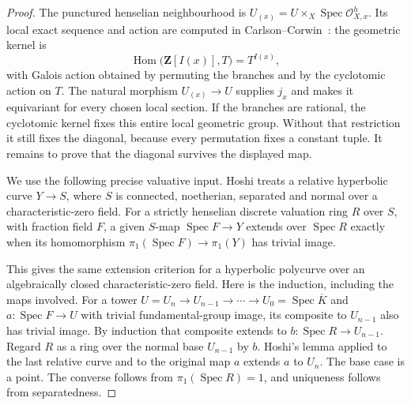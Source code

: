\documentclass[11pt,a4paper]{article}
\begin{document}
\begin{proof}
The punctured henselian neighbourhood is
$U_{(x)}=U\times_X\operatorname{Spec}\mathcal O^h_{X,x}$.
Its local exact sequence and action are computed in
Carlson--Corwin~\cite[Proposition 3.4]{B_CarlsonCorwin2026}:
the geometric kernel is
\[
 \operatorname{Hom}\bigl(\mathbf Z[I(x)],T\bigr)=T^{I(x)},
\]
with Galois action obtained by permuting the branches and by the
cyclotomic action on $T$. The natural morphism $U_{(x)}\to U$ supplies
$j_x$ and makes it equivariant for every chosen local section. If the
branches are rational, the cyclotomic kernel fixes this entire local
geometric group. Without that restriction it still fixes the diagonal,
because every permutation fixes a constant tuple. It remains to prove
that the diagonal survives the displayed map.

We use the following precise valuative input. Hoshi
\cite[Lemma 2.8, pp.~175--176]{B_Hoshi2014} treats a relative hyperbolic
curve $Y\to S$, where $S$ is connected, noetherian, separated and
normal over a characteristic-zero field. For a strictly henselian
discrete valuation ring $R$ over $S$, with fraction field $F$, a given
$S$-map $\operatorname{Spec}F\to Y$ extends over
$\operatorname{Spec}R$ exactly when its homomorphism
$\pi_1(\operatorname{Spec}F)\to\pi_1(Y)$ has trivial image.

This gives the same extension criterion for a hyperbolic polycurve over
an algebraically closed characteristic-zero field. Here is the
induction, including the maps involved. For a tower
$U=U_n\to U_{n-1}\to\cdots\to U_0=\operatorname{Spec}\overline K$
and $a:\operatorname{Spec}F\to U$ with trivial fundamental-group
image, its composite to $U_{n-1}$ also has trivial image. By induction
that composite extends to $b:\operatorname{Spec}R\to U_{n-1}$.
Regard $R$ as a ring over the normal base $U_{n-1}$ by $b$.
Hoshi's lemma applied to the last relative curve and to the original
map $a$ extends $a$ to $U_n$. The base case is a point. The converse
follows from $\pi_1(\operatorname{Spec}R)=1$, and uniqueness follows
from separatedness.


\end{proof}
\end{document}
